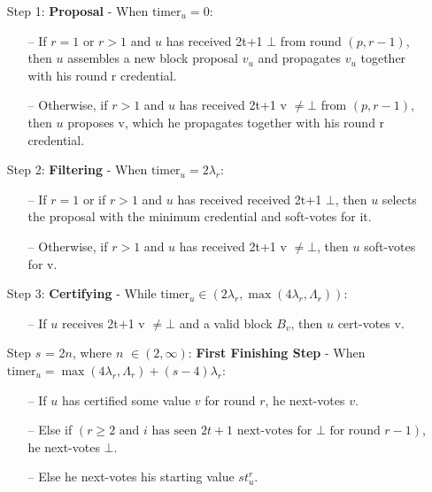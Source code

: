\documentclass{article}
\begin{document}
    \begin{enumerate}

        \item[] Step 1: \textbf{Proposal} - When $\text{timer}_u = 0$:
        \begin{itemize}
            \item[--] If $r = 1$ or $r > 1$ and $u$ has received 2t+1  $\bot$ from round $(p, r - 1)$, then $u$ assembles a new block proposal $v_u$ and propagates $v_u$ together with his round r credential.
            \item[--] Otherwise, if $r > 1$ and $u$ has received 2t+1  v $\neq \bot$ from $(p, r-1)$, then $u$  proposes v, which he propagates together with his round r credential.
        \end{itemize}

        \item[] Step 2: \textbf{Filtering} - When $\text{timer}_u = 2\lambda_r$:
        \begin{itemize}
            \item[--] If $r = 1$ or if $r > 1$ and $u$ has received received 2t+1  $\bot$, then $u$ selects the proposal with the minimum credential and soft-votes for it.
            \item[--] Otherwise, if $r > 1$ and $u$ has received 2t+1  v $\neq \bot$, then $u$ soft-votes for v.
        \end{itemize}

        \item[] Step 3: \textbf{Certifying} - While $\text{timer}_u \in (2\lambda_r, \max(4\lambda_r, \Lambda_r))$:
        \begin{itemize}
            \item[--] If $u$ receives 2t+1  v $\neq \bot$ and a valid block $B_v$, then $u$ cert-votes v.
        \end{itemize}

        \item[] Step $s$ = 2$n$, where $n$ $\in (2, \infty)$: \textbf{First Finishing Step} - When $\text{timer}_u = \max(4\lambda_r, \Lambda_r) + (s-4)\lambda_r$:
        \begin{itemize}
            \item[--] If $u$ has certified some value $v$ for round $r$, he next-votes $v$.
            \item[--] Else if $(r \geq 2 \text{ and } i \text{ has seen } 2t+1 \text{ next-votes for } \bot \text{ for round } r-1)$, he next-votes $\bot$.
            \item[--] Else he next-votes his starting value $st^r_u$.
        \end{itemize}


\end{enumerate}
\end{document}
